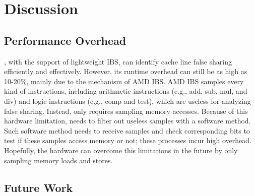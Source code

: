 \section{Discussion}

\label{sec:discuss}

\subsection{Performance Overhead}

\Cheetah{}, with the support of lightweight IBS, can identify cache line false sharing efficiently and effectively. However, its runtime overhead can still be as high as 10-20\%, mainly due to the mechanism of AMD IBS. AMD IBS samples every kind of instructions, including arithmetic instructions (e.g., add, sub, mul, and div) and logic instructions (e.g., comp and test), which are useless for analyzing false sharing. Instead, \cheetah{} only requires sampling memory accesses. Because of this hardware limitation, \cheetah{} needs to filter out useless samples with a software method. Such software method needs \cheetah{} to receive samples and check corresponding bits to test if these samples access memory or not; these processes incur high overhead. Hopefully, the hardware can overcome this limitations in the future by only sampling memory loads and stores.

\subsection{Future Work}
